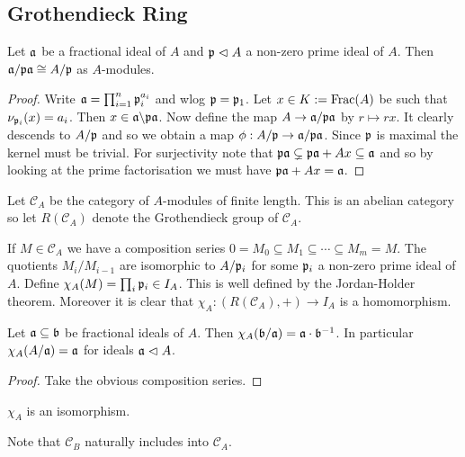 \documentclass{memoir}
\begin{document}
\subsection{Grothendieck Ring}
\begin{proposition}
    Let $\mathfrak{a}$ be a fractional ideal of $A$ and $\mathfrak{p}\vartriangleleft A$ a non-zero prime ideal of $A$.
    Then $\mathfrak{a}/\mathfrak{p}\mathfrak{a} \cong A/\mathfrak{p}$ as $A$-modules.
\end{proposition}
\begin{proof}
    Write $\mathfrak{a} = \prod_{i = 1}^n\mathfrak{p}_i^{a_i}$ and wlog $\mathfrak{p} = \mathfrak{p}_1$.
    Let $x\in K:= \text{Frac}(A)$ be such that $\nu_{\mathfrak{p}_i}(x) = a_i$.
    Then $x\in \mathfrak{a}\backslash \mathfrak{p} \mathfrak{a}$.
    Now define the map $A\to \mathfrak{a}/\mathfrak{p}\mathfrak{a}$ by $r\mapsto rx$.
    It clearly descends to $A/\mathfrak{p}$ and so we obtain a map $\phi:A/\mathfrak{p}\to \mathfrak{a}/\mathfrak{p}\mathfrak{a}$.
    Since $\mathfrak{p}$ is maximal the kernel must be trivial.
    For surjectivity note that $\mathfrak{p}\mathfrak{a}\subsetneq \mathfrak{p}\mathfrak{a}+ Ax \subseteq \mathfrak{a}$ and so by looking at the prime factorisation we must have $\mathfrak{p} \mathfrak{a} + Ax = \mathfrak{a}$.
\end{proof}
\begin{definition}
    Let $\mathcal C_A$ be the category of $A$-modules of finite length.
    This is an abelian category so let $R(\mathcal C_A)$ denote the Grothendieck group of $\mathcal C_A$.

    If $M\in \mathcal C_A$ we have a composition series $0=M_0\subseteq M_1\subseteq \cdots\subseteq M_m = M$.
    The quotients $M_i/M_{i-1}$ are isomorphic to $A/\mathfrak{p}_i$ for some $\mathfrak{p}_i$ a non-zero prime ideal of $A$.
    Define $\chi_A(M) = \prod_i\mathfrak{p}_i \in I_A$.
    This is well defined by the Jordan-Holder theorem.
    Moreover it is clear that $\chi_A:(R(\mathcal C_A),+) \to I_A$ is a homomorphism.
\end{definition}
\begin{proposition}
    Let $\mathfrak{a}\subseteq \mathfrak{b}$ be fractional ideals of $A$.
    Then $\chi_A(\mathfrak{b}/\mathfrak{a}) = \mathfrak{a}\cdot \mathfrak{b}^{-1}$.
    In particular $\chi_A(A/\mathfrak{a}) = \mathfrak{a}$ for ideals $\mathfrak{a}\vartriangleleft A$.
\end{proposition}
\begin{proof}
    Take the obvious composition series.
\end{proof}
\begin{corollary}
    $\chi_A$ is an isomorphism.
\end{corollary}
\begin{remark}
    Note that $\mathcal C_B$ naturally includes into $\mathcal C_A$.
\end{remark}
\end{document}
